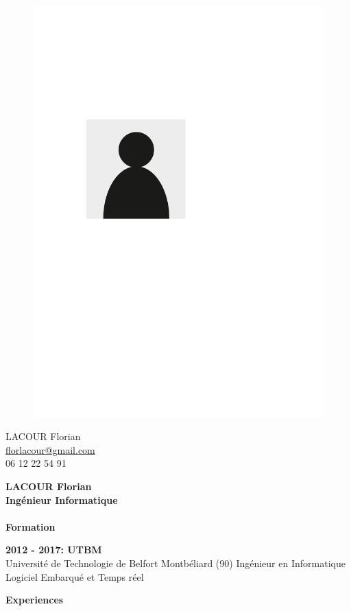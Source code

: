 \documentclass[a4paper,11pt,final]{memoir}
\newcommand{\CVSection}[1]
	{\Large\textbf{#1}\par
	\normalsize\normalfont}
\newcommand{\CVItem}[1]
	{\textbf{\color{RoyalBlue} #1}}
\begin{document}
\begin{figure}
	\hfill
	\includegraphics[width=0.6\columnwidth]{photo}
	\vspace{-9cm}
\end{figure}

\begin{flushright}\small
	LACOUR Florian \\
	\url{florlacour@gmail.com}  \\
	06 12 22 54 91
\end{flushright}\normalsize
\framebreak


\Huge\bfseries {\color{RoyalBlue}  LACOUR Florian} \\
\Large\bfseries  Ingénieur Informatique \\ \\
\CVSection{Formation}
\CVItem{2012  - 2017: UTBM }\\
Université de Technologie de Belfort Montbéliard (90) Ingénieur en Informatique Logiciel Embarqué et Temps réel 

\CVSection{Experiences}
\end{document}
